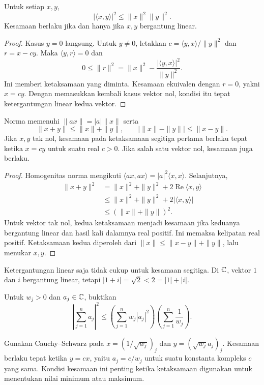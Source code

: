 \begin{teorema}
    Untuk setiap $x,y$,
    \[
        |\langle x,y\rangle|^2\le\|x\|^2\|y\|^2.
    \]
    Kesamaan berlaku jika dan hanya jika $x,y$ bergantung linear.
\end{teorema}
\begin{proof}
    Kasus $y=0$ langsung. Untuk $y\ne0$, letakkan
    $c=\langle y,x\rangle/\|y\|^2$ dan $r=x-cy$.
    Maka $\langle y,r\rangle=0$ dan
    \[
        0\le\|r\|^2
          =\|x\|^2-\frac{|\langle y,x\rangle|^2}{\|y\|^2}.
    \]
    Ini memberi ketaksamaan yang diminta.
    Kesamaan ekuivalen dengan $r=0$, yakni $x=cy$.
    Dengan memasukkan kembali kasus vektor nol, kondisi itu
    tepat ketergantungan linear kedua vektor.
\end{proof}

\begin{prop}
    Norma memenuhi $\|ax\|=|a|\|x\|$ serta
    \[
        \|x+y\|\le\|x\|+\|y\|,\qquad
        \bigl|\|x\|-\|y\|\bigr|\le\|x-y\|.
    \]
    Jika $x,y$ tak nol, kesamaan pada ketaksamaan segitiga
    pertama berlaku tepat ketika $x=cy$ untuk suatu real $c>0$.
    Jika salah satu vektor nol, kesamaan juga berlaku.
\end{prop}
\begin{proof}
    Homogenitas norma mengikuti $\langle ax,ax\rangle
    =|a|^2\langle x,x\rangle$.
    Selanjutnya,
    \begin{align*}
        \|x+y\|^2
        &=\|x\|^2+\|y\|^2+2\operatorname{Re}\langle x,y\rangle\\
        &\le\|x\|^2+\|y\|^2+2|\langle x,y\rangle|\\
        &\le(\|x\|+\|y\|)^2.
    \end{align*}
    Untuk vektor tak nol, kedua ketaksamaan menjadi kesamaan
    jika keduanya bergantung linear dan hasil kali dalamnya
    real positif. Ini memaksa kelipatan real positif.
    Ketaksamaan kedua diperoleh dari
    $\|x\|\le\|x-y\|+\|y\|$, lalu menukar $x,y$.
\end{proof}

Ketergantungan linear saja tidak cukup untuk kesamaan segitiga.
Di $\mathbb{C}$, vektor $1$ dan $i$ bergantung linear, tetapi
$|1+i|=\sqrt2<2=|1|+|i|$.

\begin{exam}
    Untuk $w_j>0$ dan $a_j\in\mathbb{C}$, buktikan
    \[
        \left|\sum_{j=1}^n a_j\right|^2
        \le\left(\sum_{j=1}^n w_j|a_j|^2\right)
            \left(\sum_{j=1}^n\frac1{w_j}\right).
    \]
\end{exam}
\begin{solution}
    Gunakan Cauchy--Schwarz pada
    $x=(1/\sqrt{w_j})_j$ dan $y=(\sqrt{w_j}a_j)_j$.
    Kesamaan berlaku tepat ketika $y=cx$, yaitu
    $a_j=c/w_j$ untuk suatu konstanta kompleks $c$ yang sama.
    Kondisi kesamaan ini penting ketika ketaksamaan digunakan
    untuk menentukan nilai minimum atau maksimum.
\end{solution}

